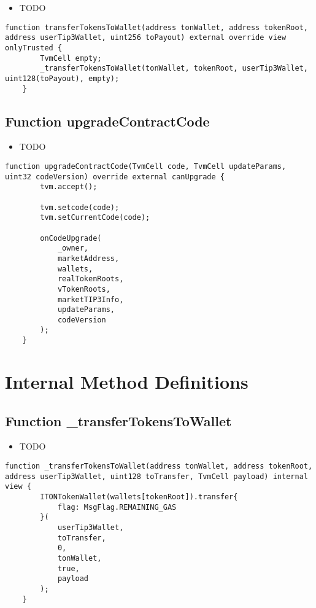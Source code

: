 \noindent\begin{itemize}
\item TODO
\end{itemize}

\begin{lstlisting}[firstnumber=152]
    function transferTokensToWallet(address tonWallet, address tokenRoot, address userTip3Wallet, uint256 toPayout) external override view onlyTrusted {
        TvmCell empty;
        _transferTokensToWallet(tonWallet, tokenRoot, userTip3Wallet, uint128(toPayout), empty);
    }
\end{lstlisting}

\subsection{Function upgradeContractCode}

\noindent\begin{itemize}
\item TODO
\end{itemize}

\begin{lstlisting}[firstnumber=64]
    function upgradeContractCode(TvmCell code, TvmCell updateParams, uint32 codeVersion) override external canUpgrade {
        tvm.accept();

        tvm.setcode(code);
        tvm.setCurrentCode(code);
        
        onCodeUpgrade(
            _owner,
            marketAddress,
            wallets,
            realTokenRoots,
            vTokenRoots,
            marketTIP3Info,
            updateParams,
            codeVersion
        );
    }
\end{lstlisting}

\section{Internal Method Definitions}


\subsection{Function \_{}transferTokensToWallet}

\noindent\begin{itemize}
\item TODO
\end{itemize}

\begin{lstlisting}[firstnumber=157]
    function _transferTokensToWallet(address tonWallet, address tokenRoot, address userTip3Wallet, uint128 toTransfer, TvmCell payload) internal view {
        ITONTokenWallet(wallets[tokenRoot]).transfer{
            flag: MsgFlag.REMAINING_GAS
        }(
            userTip3Wallet,
            toTransfer,
            0,
            tonWallet,
            true,
            payload
        );
    }
\end{lstlisting}


